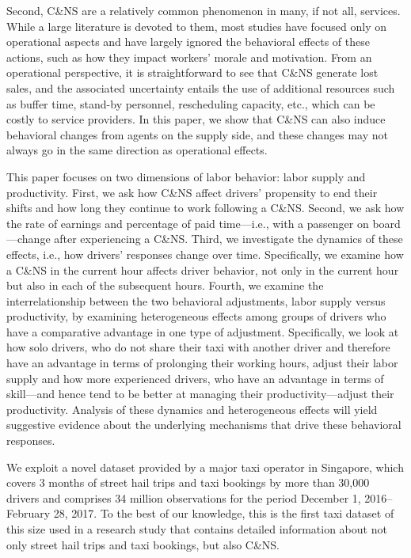 \documentclass[reviewmode]{restud}
\begin{document}
Second, C\&NS are a relatively common phenomenon in many, if not all, services. While a large literature is devoted to them, most studies \citep{moore2001time,liu2010dynamic,feldman2014appointment,zacharias2014appointment} have focused only on operational aspects and have largely ignored the behavioral effects of these actions, such as how they impact workers' morale and motivation. From an operational perspective, it is straightforward to see that C\&NS generate lost sales, and the associated uncertainty entails the use of additional resources such as buffer time, stand-by personnel, rescheduling capacity, etc., which can be costly to service providers. In this paper, we show that C\&NS can also induce behavioral changes from agents on the supply side, and these changes may not always go in the same direction as operational effects.

This paper focuses on two dimensions of labor behavior: labor supply and productivity. First, we ask how C\&NS affect drivers' propensity to end their shifts and how long they continue to work following a C\&NS. Second, we ask how the rate of earnings and percentage of paid time---i.e., with a passenger on board---change after experiencing a C\&NS. Third, we investigate the dynamics of these effects, i.e., how drivers' responses change over time. Specifically, we examine how a C\&NS in the current hour affects driver behavior, not only in the current hour but also in each of the subsequent hours. Fourth, we examine the interrelationship between the two behavioral adjustments, labor supply versus productivity, by examining heterogeneous effects among groups of drivers who have a comparative advantage in one type of adjustment. Specifically, we look at how solo drivers, who do not share their taxi with another driver and therefore have an advantage in terms of prolonging their working hours, adjust their labor supply and how more experienced drivers, who have an advantage in terms of skill---and hence tend to be better at managing their productivity---adjust their productivity. Analysis of these dynamics and heterogeneous effects will yield suggestive evidence about the underlying mechanisms that drive these behavioral responses.

We exploit a novel dataset provided by a major taxi operator in Singapore, which covers 3 months of street hail trips and taxi bookings by more than 30,000 drivers and comprises 34 million observations for the period December 1, 2016--February 28, 2017. To the best of our knowledge, this is the first taxi dataset of this size used in a research study that contains detailed information about not only street hail trips and taxi bookings, but also C\&NS.
\end{document}
